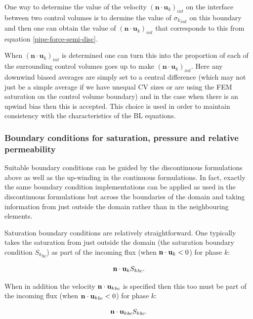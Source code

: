 One way to determine the value of the velocity
$({{\mathbf n}\cdot{\mathbf u}_k})_{int}$
on the interface between two control volumes
is to dermine the value of ${\sigma_k}_{int}$ on this boundary
and then one can obtain the value of
$({{\mathbf n}\cdot{\mathbf u}_k})_{int}$ that
corresponds to this from equation \ref{pipe-force-semi-disc}.

When $({{\mathbf n}\cdot{\mathbf u}_k})_{int}$
is determined one can turn this
into the proportion of each of the surrounding control
volumes goes up to make
$({{\mathbf n}\cdot{\mathbf u}_k})_{int}$. Here any downwind
biased averages are simply set to a central difference
(which may not just be a simple average if we have
unequal CV sizes or are using the FEM saturation
on the control volume boundary) and in the case
when there is an upwind bias then this is accepted.
This choice is used in order to maintain consistency
with the characteristics of the BL equations.







\subsubsection{Boundary conditions for saturation, pressure and relative permeability}
\label{pipe-bcs-rel-perm}
Suitable boundary conditions can be guided by the
discontinuous formulations above as well as the up-winding in
the continuous formulations. In fact, exactly the same
boundary condition implementations can be applied as used in
the discontinuous formulations but across the boundaries
of the domain and taking information from just outside the domain
rather than in the neighbouring elements.

Saturation boundary conditions are relatively straightforward.
One typically takes the saturation from just outside the domain
(the saturation boundary condition ${S_k}_{bc}$)
as part of the incoming flux
(when ${\bf n}\cdot {\bf u}_k<0$) for phase $k$:

\begin{equation}
{\bf n}\cdot {\bf u}_k {S_k}_{bc} .
\end{equation}

When in addition the velocity
${\bf n}\cdot {{\bf u}_k}_{bc}$ is
specified then this too must be part of the
incoming flux (when ${\bf n}\cdot {{\bf u}_k}_{bc}<0$) for phase $k$:

\begin{equation}
{\bf n}\cdot {{\bf u}_k}_{bc} {S_k}_{bc} .
\end{equation}

